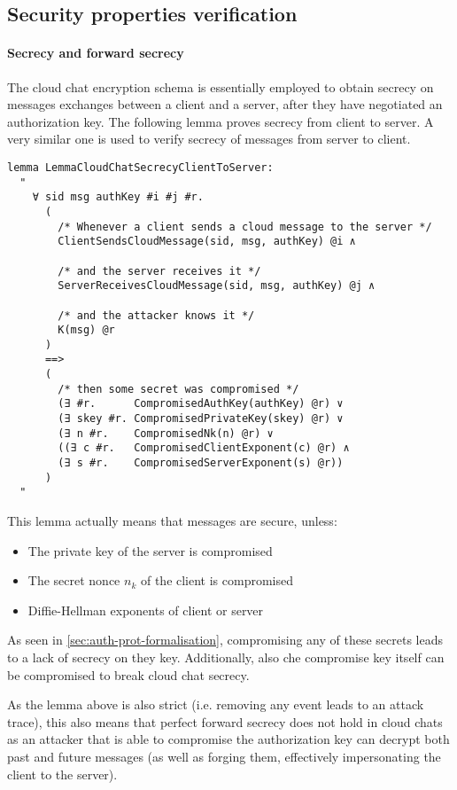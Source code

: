\subsection{Security properties verification}

\paragraph{Secrecy and forward secrecy} The cloud chat encryption schema is essentially employed to obtain secrecy on messages exchanges between a client and a server, after they have negotiated an authorization key.
The following lemma proves secrecy from client to server. A very similar one is used to verify secrecy of messages from server to client.

\begin{lstlisting}
lemma LemmaCloudChatSecrecyClientToServer:
  "
    ∀ sid msg authKey #i #j #r.
      (
        /* Whenever a client sends a cloud message to the server */
        ClientSendsCloudMessage(sid, msg, authKey) @i ∧

        /* and the server receives it */
        ServerReceivesCloudMessage(sid, msg, authKey) @j ∧

        /* and the attacker knows it */
        K(msg) @r
      )
      ==>
      (
        /* then some secret was compromised */
        (∃ #r.      CompromisedAuthKey(authKey) @r) ∨
        (∃ skey #r. CompromisedPrivateKey(skey) @r) ∨
        (∃ n #r.    CompromisedNk(n) @r) ∨
        ((∃ c #r.   CompromisedClientExponent(c) @r) ∧
        (∃ s #r.    CompromisedServerExponent(s) @r))
      )
  "
\end{lstlisting}

This lemma actually means that messages are secure, unless:
\begin{itemize}
  \item The private key of the server is compromised
  \item The secret nonce $n_k$ of the client is compromised
  \item Diffie-Hellman exponents of client or server
\end{itemize}

As seen in \cref{sec:auth-prot-formalisation}, compromising any of these secrets leads to a lack of secrecy on they key. Additionally, also che compromise key itself can be compromised to break cloud chat secrecy.

As the lemma above is also strict (i.e. removing any event leads to an attack trace), this also means that perfect forward secrecy does not hold in cloud chats as an attacker that is able to compromise the authorization key can decrypt both past and future messages (as well as forging them, effectively impersonating the client to the server).

